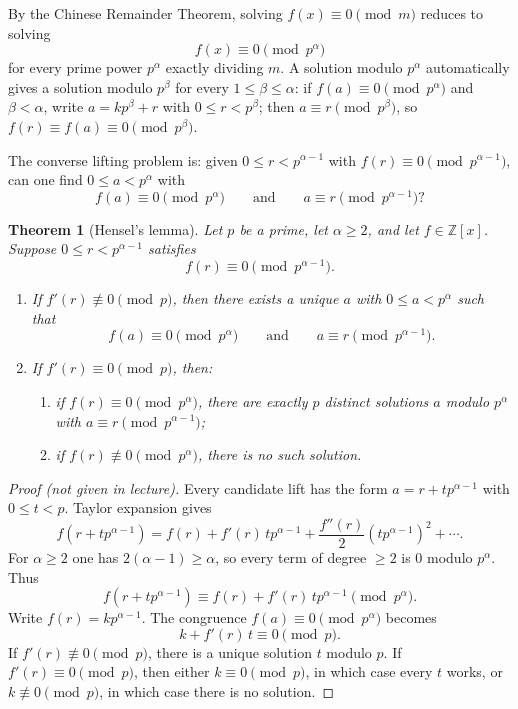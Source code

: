 \documentclass[11pt]{article}
\newtheorem{theorem}{Theorem}[section]
\theoremstyle{remark}
\newcommand{\Z}{\mathbb Z}
\begin{document}
By the Chinese Remainder Theorem, solving $f(x)\equiv 0\pmod m$ reduces to
solving
\[
    f(x)\equiv 0\pmod{p^\alpha}
\]
for every prime power $p^\alpha$ exactly dividing $m$. A solution modulo
$p^\alpha$ automatically gives a solution modulo $p^\beta$ for every
$1\le\beta\le\alpha$: if $f(a)\equiv 0\pmod{p^\alpha}$ and $\beta<\alpha$,
write $a=kp^\beta+r$ with $0\le r<p^\beta$; then $a\equiv r\pmod{p^\beta}$,
so $f(r)\equiv f(a)\equiv 0\pmod{p^\beta}$.

The converse lifting problem is: given $0\le r<p^{\alpha-1}$ with
$f(r)\equiv 0\pmod{p^{\alpha-1}}$, can one find $0\le a<p^\alpha$ with
\[
    f(a)\equiv 0\pmod{p^\alpha}
    \qquad\text{and}\qquad
    a\equiv r\pmod{p^{\alpha-1}}?
\]

\begin{theorem}[Hensel's lemma]
Let $p$ be a prime, let $\alpha\ge 2$, and let $f\in\Z[x]$. Suppose
$0\le r<p^{\alpha-1}$ satisfies
\[
    f(r)\equiv 0\pmod{p^{\alpha-1}}.
\]

\begin{enumerate}[label=\arabic*.]
    \item If $f'(r)\not\equiv 0\pmod p$, then there exists a unique $a$ with
    $0\le a<p^\alpha$ such that
    \[
        f(a)\equiv 0\pmod{p^\alpha}
        \qquad\text{and}\qquad
        a\equiv r\pmod{p^{\alpha-1}}.
    \]

    \item If $f'(r)\equiv 0\pmod p$, then:
    \begin{enumerate}[label=(\roman*)]
        \item if $f(r)\equiv 0\pmod{p^\alpha}$, there are exactly $p$ distinct
        solutions $a$ modulo $p^\alpha$ with $a\equiv r\pmod{p^{\alpha-1}}$;

        \item if $f(r)\not\equiv 0\pmod{p^\alpha}$, there is no such solution.
    \end{enumerate}
\end{enumerate}
\end{theorem}

\begin{proof}[Proof (not given in lecture)]
Every candidate lift has the form $a=r+tp^{\alpha-1}$ with $0\le t<p$.
Taylor expansion gives
\[
    f(r+tp^{\alpha-1})
    =
    f(r)+f'(r)\,tp^{\alpha-1}
    +\frac{f''(r)}{2}(tp^{\alpha-1})^2
    +\cdots.
\]
For $\alpha\ge 2$ one has $2(\alpha-1)\ge\alpha$, so every term of degree
$\ge 2$ is $0$ modulo $p^\alpha$. Thus
\[
    f(r+tp^{\alpha-1})
    \equiv
    f(r)+f'(r)\,tp^{\alpha-1}
    \pmod{p^\alpha}.
\]
Write $f(r)=kp^{\alpha-1}$. The congruence $f(a)\equiv 0\pmod{p^\alpha}$
becomes
\[
    k+f'(r)\,t\equiv 0\pmod p.
\]
If $f'(r)\not\equiv 0\pmod p$, there is a unique solution $t$ modulo $p$.
If $f'(r)\equiv 0\pmod p$, then either $k\equiv 0\pmod p$, in which case
every $t$ works, or $k\not\equiv 0\pmod p$, in which case there is no
solution.
\end{proof}
\end{document}
